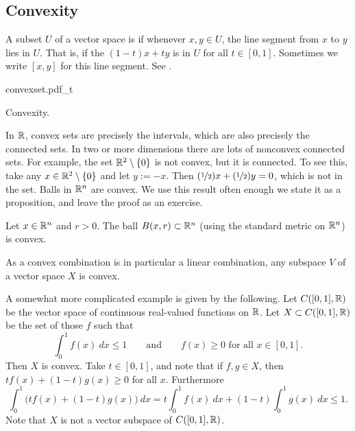 \subsection{Convexity}

A subset $U$ of a vector space is \emph{}
if whenever $x,y \in U$, the line segment from
$x$ to $y$ lies in $U$.  That is, if the \emph{}
$(1-t)x+ty$ is in $U$ for all $t \in [0,1]$.
Sometimes we write $[x,y]$ for this line segment.
See .

\begin{myfigureht}
{convexset.pdf_t}
\caption{Convexity.\label{mv:convexcomb}}
\end{myfigureht}

In ${\mathbb{R}}$, convex sets are precisely the intervals, which are
also precisely the connected sets.
In two or more dimensions
there are lots of nonconvex connected sets.  For example,
the set ${\mathbb{R}}^2 \setminus \{0\}$ is not convex, but it is connected.  To see
this, take any $x \in {\mathbb{R}}^2 \setminus \{0\}$ and let $y:=-x$.
Then $(\nicefrac{1}{2})x + (\nicefrac{1}{2})y = 0$, which is not in the set.
Balls in ${\mathbb{R}}^n$ are convex.  We use this result often enough we state
it as a proposition, and leave the proof as an exercise.

\begin{prop}
Let $x \in {\mathbb{R}}^n$ and $r > 0$.  The ball $B(x,r) \subset {\mathbb{R}}^n$ (using the
standard metric on ${\mathbb{R}}^n$) is convex.
\end{prop}

\begin{example}
As a convex combination is in particular a linear combination,
any subspace $V$ of a vector space $X$ is convex.
\end{example}

\begin{example}
A somewhat more complicated example is given by the following.  Let
$C([0,1],{\mathbb{R}})$ be the vector space of continuous real-valued functions on ${\mathbb{R}}$.
Let $X \subset C([0,1],{\mathbb{R}})$ be the set of those $f$ such that
\begin{equation*}
\int_0^1 f(x)~dx \leq 1 \qquad \text{and} \qquad
f(x) \geq 0 \text{ for all $x \in [0,1]$} .
\end{equation*}
Then $X$ is convex.  Take $t \in [0,1]$, and note that if $f,g \in X$,
then $t f(x) + (1-t) g(x) \geq 0$ for all $x$.  Furthermore
\begin{equation*}
\int_0^1 \bigl(tf(x) + (1-t)g(x)\bigr) ~dx
=
t \int_0^1 f(x) ~dx
+ (1-t)\int_0^1 g(x) ~dx \leq 1 .
\end{equation*}
Note that $X$ is not a vector subspace of $C([0,1],{\mathbb{R}})$.
\end{example}

